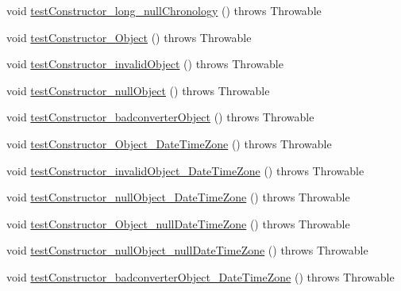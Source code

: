 \begin{DoxyCompactItemize}
\item 
void \hyperlink{classorg_1_1joda_1_1time_1_1_test_mutable_date_time___constructors_a727e6f34b8f636c05571ae57290823f9}{test\-Constructor\-\_\-long\-\_\-null\-Chronology} ()  throws Throwable 
\item 
void \hyperlink{classorg_1_1joda_1_1time_1_1_test_mutable_date_time___constructors_a0fa88b82439e4bb97ccf302c1dc65bd8}{test\-Constructor\-\_\-\-Object} ()  throws Throwable 
\item 
void \hyperlink{classorg_1_1joda_1_1time_1_1_test_mutable_date_time___constructors_aa5df8d8c5fc70044a219cf479260ba1e}{test\-Constructor\-\_\-invalid\-Object} ()  throws Throwable 
\item 
void \hyperlink{classorg_1_1joda_1_1time_1_1_test_mutable_date_time___constructors_ac3f9333816fcfb76dc68782c532c175b}{test\-Constructor\-\_\-null\-Object} ()  throws Throwable 
\item 
void \hyperlink{classorg_1_1joda_1_1time_1_1_test_mutable_date_time___constructors_abf3e748c70ee0446e95685f157736508}{test\-Constructor\-\_\-badconverter\-Object} ()  throws Throwable 
\item 
void \hyperlink{classorg_1_1joda_1_1time_1_1_test_mutable_date_time___constructors_abbd7ca0f217940b882e1da197c6e42d8}{test\-Constructor\-\_\-\-Object\-\_\-\-Date\-Time\-Zone} ()  throws Throwable 
\item 
void \hyperlink{classorg_1_1joda_1_1time_1_1_test_mutable_date_time___constructors_a34410adcb16e82f7ad41fae96692465d}{test\-Constructor\-\_\-invalid\-Object\-\_\-\-Date\-Time\-Zone} ()  throws Throwable 
\item 
void \hyperlink{classorg_1_1joda_1_1time_1_1_test_mutable_date_time___constructors_aaac2bbb2b2ea66acc3b8c82de54a726c}{test\-Constructor\-\_\-null\-Object\-\_\-\-Date\-Time\-Zone} ()  throws Throwable 
\item 
void \hyperlink{classorg_1_1joda_1_1time_1_1_test_mutable_date_time___constructors_aea948315a7a0939150b1f861a798d0e9}{test\-Constructor\-\_\-\-Object\-\_\-null\-Date\-Time\-Zone} ()  throws Throwable 
\item 
void \hyperlink{classorg_1_1joda_1_1time_1_1_test_mutable_date_time___constructors_ad1512063755d2f693aa389d0b2395d6a}{test\-Constructor\-\_\-null\-Object\-\_\-null\-Date\-Time\-Zone} ()  throws Throwable 
\item 
void \hyperlink{classorg_1_1joda_1_1time_1_1_test_mutable_date_time___constructors_a0950180e30642ffa48615fd26601ba6f}{test\-Constructor\-\_\-badconverter\-Object\-\_\-\-Date\-Time\-Zone} ()  throws Throwable 

\end{DoxyCompactItemize}
